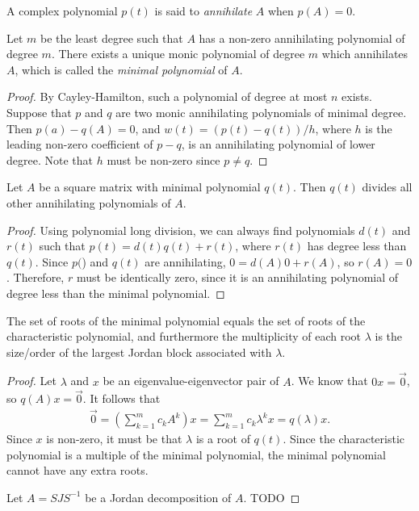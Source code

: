 \begin{defn}
    A complex polynomial $p(t)$ is said to \emph{annihilate} $A$ when $p(A) = 0$.
\end{defn}

\begin{defn}
    Let $m$ be the least degree such that $A$ has a non-zero annihilating polynomial of degree $m$. There exists a unique monic polynomial of degree $m$ which annihilates $A$, which is called the \emph{minimal polynomial} of $A$.
\end{defn}

\begin{proof}
    By Cayley-Hamilton, such a polynomial of degree at most $n$ exists. Suppose that $p$ and $q$ are two monic annihilating polynomials of minimal degree. Then $p(a) - q(A) = 0$, and $w(t) = (p(t) - q(t))/h$, where $h$ is the leading non-zero coefficient of $p-q$, is an annihilating polynomial of lower degree. Note that $h$ must be non-zero since $p \neq q$.
\end{proof}

\begin{thm}
    Let $A$ be a square matrix with minimal polynomial $q(t)$. Then $q(t)$ divides all other annihilating polynomials of $A$.
\end{thm}

\begin{proof}
    Using polynomial long division, we can always find polynomials $d(t)$ and $r(t)$ such that $p(t) = d(t)q(t) + r(t)$, where $r(t)$ has degree less than $q(t)$. Since $p($) and $q(t)$ are annihilating, $0 = d(A)0 + r(A)$, so $r(A) = 0$. Therefore, $r$ must be identically zero, since it is an annihilating polynomial of degree less than the minimal polynomial.
\end{proof}

\begin{thm}
    The set of roots of the minimal polynomial equals the set of roots of the characteristic polynomial, and furthermore the multiplicity of each root $\lambda$ is the size/order of the largest Jordan block associated with $\lambda$.
\end{thm}

\begin{proof}
    Let $\lambda$ and $x$ be an eigenvalue-eigenvector pair of $A$. We know that $0x = \vec{0}$, so $q(A)x = \vec{0}$. It follows that
    \begin{align*}
        \vec{0} = \left(\sum_{k=1}^{m}c_kA^k\right)x = \sum_{k=1}^{m}c_k\lambda^kx = q(\lambda)x.
    \end{align*}
    Since $x$ is non-zero, it must be that $\lambda$ is a root of $q(t)$. Since the characteristic polynomial is a multiple of the minimal polynomial, the minimal polynomial cannot have any extra roots.

    Let $A = SJS^{-1}$ be a Jordan decomposition of $A$.  {\color{red}\Large TODO}
\end{proof}

